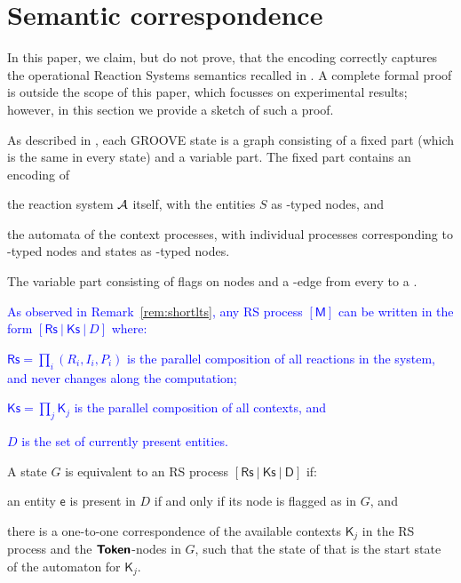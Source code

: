 
\section{Semantic correspondence}\label{app:semantics}

In this paper, we claim, but do not prove, that the \GROOVE encoding correctly captures the operational Reaction Systems semantics recalled in . A complete formal proof is outside the scope of this paper, which focusses on experimental results; however, in this section we provide a sketch of such a proof.

As described in , each GROOVE state is a graph consisting of a fixed part (which is the same in every state) and a variable part. The fixed part contains an encoding of
\begin{enumerate*}[label=\emph{(\roman*)}]
\item the reaction system $\cal A$ itself, with the entities $S$ as \Entity-typed nodes, and
\item the automata of the context processes, with individual processes corresponding to \Token-typed nodes and states as \State-typed nodes.
\end{enumerate*} 
The variable part consisting of \present flags on \Entity nodes and a \current-edge from every \Token to a \State. 
\textcolor{blue}{
As observed in Remark~\ref{rem:shortlts}, any RS process $[\mathsf{M}]$ can be written in the form $[\mathsf{Rs}~|~\mathsf{Ks}~|~D]$ where:
\begin{enumerate*}[label=\emph{(\roman*)}]
\item  $\mathsf{Rs}=\prod_i (R_i,I_i,P_i)$ is the parallel composition of all reactions in the system, and never changes along the computation;
\item $\mathsf{Ks}=\prod_j \mathsf{K}_j$ is the parallel composition of all contexts, and 
\item $D$ is the set of currently present entities.
\end{enumerate*}
}

A \GROOVE state $G$ is equivalent to an RS process $[\mathsf{\mathsf{Rs}~|~\mathsf{Ks}~|~D}]$ if:
%
\begin{enumerate*}[label=\emph{(\roman*)}]
\item an entity $\mathsf{e}$ is present in $D$ if and only if its \Entity node is flagged as \present in $G$, and
\item there is a one-to-one correspondence of the available contexts $\mathsf{K}_j$ in the RS process and the ${\text{\bfseries\sffamily Token}}$-nodes in $G$, such that the \current state of that \Token is the start state of the automaton for $\mathsf{K}_j$.
\end{enumerate*}

